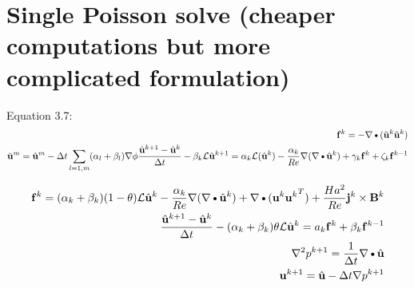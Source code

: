 \documentclass[11pt]{article}
\begin{document}
\newpage
\section{Single Poisson solve (cheaper computations but more complicated formulation)}
Equation 3.7:
\begin{equation}\begin{aligned}
\F^k = -\DEL \DOT (\tilde{\U}^k \tilde{\U}^k) \\
\tilde{\U}^m = \hat{\U}^m - \Delta t \sum_{l=1,m} (\alpha_l + \beta_l) \DEL \phi
\frac{\hat{\U}^{k+1}-\hat{\U}^k}{\Delta t} - \beta_k \MAC L \hat{\U}^{k+1} = \alpha_k \MAC L (\hat{\U}^k) - \frac{\alpha_k}{Re} \DEL (\DIV \hat{\U}^k) + \gamma_k \F^k + \zeta_k \F^{k-1} \\
\end{aligned} \end{equation}


\begin{equation}\begin{aligned}
\F^k = (\alpha_k+\beta_k)(1-\theta) \MAC L \hat{\U}^k - \frac{\alpha_k}{Re} \DEL (\DIV \hat{\U}^k) + \DEL \DOT (\U^k {\U^k}^T) + \frac{Ha^2}{Re} \J^k \CROSS \B^k \\
\frac{\hat{\U}^{k+1}-\hat{\U}^k}{\Delta t} - (\alpha_k+\beta_k)\theta  \MAC L \hat{\U}^k = a_k\F^k + \beta_k\F^{k-1} \\
\DEL^2 p^{k+1} = \frac{1}{\Delta t} \DEL \DOT \hat{\U} \\
\U^{k+1} = \hat{\U} - \Delta t \DEL p^{k+1}
\end{aligned} \end{equation}
\end{document}
